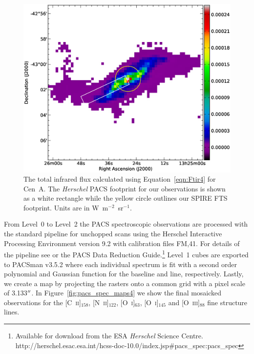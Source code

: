 \begin{figure}
\includegraphics[width=\columnwidth]{ch4/CenA_Ftir_image_v1}
\caption[A map of the total infrared flux for Centaurus~A]{The total infrared flux calculated using Equation~\ref{eqn:Ftir4} for Cen~A.  The \emph{Herschel} PACS footprint for our observations is shown as a white rectangle while the yellow circle outlines our SPIRE FTS footprint.  Units are in W~m$^{-2}$~sr$^{-1}$.}
\label{fig:F_tir4}
\end{figure}

From Level~0 to Level~2 the PACS spectroscopic observations are processed with the standard pipeline for unchopped scans using the Herschel Interactive Processing Environment \citep[HIPE; ][]{2010ASPC..434..139O} version 9.2 with calibration files FM,41.  For details of the pipeline see \citet{parkin_2013} or the PACS Data Reduction Guide.\footnote{Available for download from the ESA \emph{Herschel} Science Centre. http://herschel.esac.esa.int/hcss-doc-10.0/index.jsp\#pacs\_spec:pacs\_spec}  Level~1 cubes are exported to PACSman v3.5.2 \citep{2012A&A...548A..91L} where each individual spectrum is fit with a second order polynomial and Gaussian function for the baseline and line, respectively.  Lastly, we create a map by projecting the rasters onto a common grid with a pixel scale of 3.133$\mbox{$^{\prime\prime}$}$.  In Figure~\ref{fig:pacs_spec_maps4} we show the final mosaicked observations for the [C~\textsc{ii}]$_{158}$, [N~\textsc{ii}]$_{122}$, [O~\textsc{i}]$_{63}$, [O~\textsc{i}]$_{145}$ and [O~\textsc{iii}]$_{88}$ fine structure lines.

